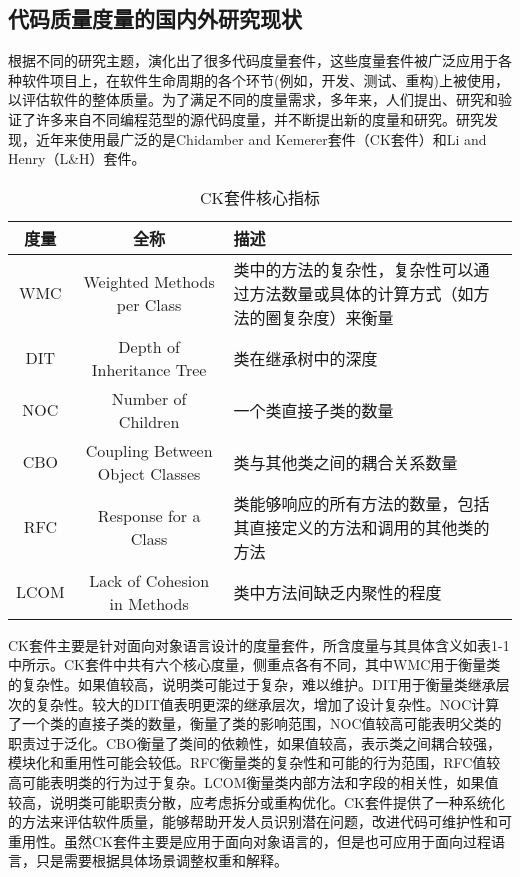 \subsection{代码质量度量的国内外研究现状}

根据不同的研究主题，演化出了很多代码度量套件，这些度量套件被广泛应用于各种软件项目上，在软件生命周期的各个环节(例如，开发、测试、重构)上被使用，以评估软件的整体质量。为了满足不同的度量需求，多年来，人们提出、研究和验证了许多来自不同编程范型的源代码度量，并不断提出新的度量和研究。研究发现\cite{Ardito2020}，近年来使用最广泛的是Chidamber and Kemerer套件（CK套件）和Li and Henry（L&H）套件。


\begin{table}[htbp]
\caption{CK套件核心指标}
\vspace{0.5em}\centering\wuhao
\begin{tabular}{ccp{7.5cm}}
\toprule
度量 & 全称 & 描述 \\
\midrule
WMC & Weighted Methods per Class & 类中的方法的复杂性，复杂性可以通过方法数量或具体的计算方式（如方法的圈复杂度）来衡量 \\
DIT & Depth of Inheritance Tree & 类在继承树中的深度 \\
NOC & Number of Children & 一个类直接子类的数量 \\
CBO & Coupling Between Object Classes & 类与其他类之间的耦合关系数量  \\
RFC & Response for a Class & 类能够响应的所有方法的数量，包括其直接定义的方法和调用的其他类的方法  \\
LCOM & Lack of Cohesion in Methods & 类中方法间缺乏内聚性的程度  \\
\bottomrule
\end{tabular}
\end{table}

CK套件主要是针对面向对象语言设计的度量套件，所含度量与其具体含义如表1-1中所示。CK套件中共有六个核心度量，侧重点各有不同，其中WMC用于衡量类的复杂性。如果值较高，说明类可能过于复杂，难以维护。DIT用于衡量类继承层次的复杂性。较大的DIT值表明更深的继承层次，增加了设计复杂性。NOC计算了一个类的直接子类的数量，衡量了类的影响范围，NOC值较高可能表明父类的职责过于泛化。CBO衡量了类间的依赖性，如果值较高，表示类之间耦合较强，模块化和重用性可能会较低。RFC衡量类的复杂性和可能的行为范围，RFC值较高可能表明类的行为过于复杂。LCOM衡量类内部方法和字段的相关性，如果值较高，说明类可能职责分散，应考虑拆分或重构优化。CK套件提供了一种系统化的方法来评估软件质量，能够帮助开发人员识别潜在问题，改进代码可维护性和可重用性。虽然CK套件主要是应用于面向对象语言的，但是也可应用于面向过程语言，只是需要根据具体场景调整权重和解释。

